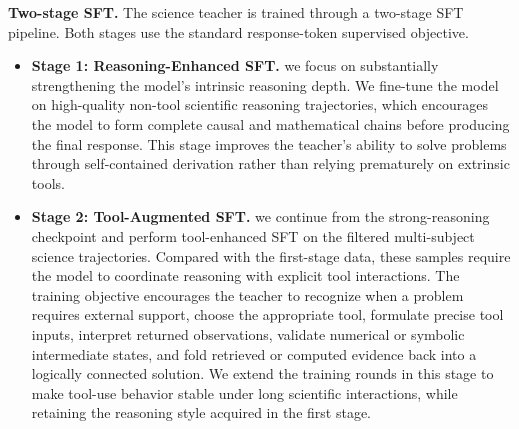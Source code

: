\textbf{Two-stage SFT.} The science teacher is trained through a two-stage SFT pipeline. Both stages use the standard response-token supervised objective.
\begin{itemize}
    \item \textbf{Stage 1: Reasoning-Enhanced SFT.} 
     we focus on substantially strengthening the model's intrinsic reasoning depth. We fine-tune the model on high-quality non-tool scientific reasoning trajectories, which encourages the model to form complete causal and mathematical chains before producing the final response. This stage improves the teacher's ability to solve problems through self-contained derivation rather than relying prematurely on extrinsic tools.

    \item \textbf{Stage 2: Tool-Augmented SFT.}
    we continue from the strong-reasoning checkpoint and perform tool-enhanced SFT on the filtered multi-subject science trajectories. Compared with the first-stage data, these samples require the model to coordinate reasoning with explicit tool interactions. The training objective encourages the teacher to recognize when a problem requires external support, choose the appropriate tool, formulate precise tool inputs, interpret returned observations, validate numerical or symbolic intermediate states, and fold retrieved or computed evidence back into a logically connected solution. We extend the training rounds in this stage to make tool-use behavior stable under long scientific interactions, while retaining the reasoning style acquired in the first stage.
\end{itemize}




